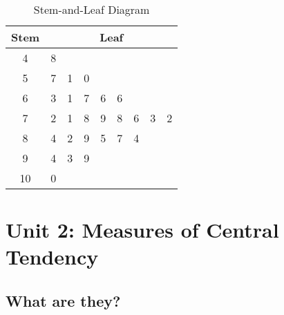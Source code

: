\documentclass[
10pt, %
a4paper, %
]{report}
\begin{document}
\begin{table}[H]
\begin{center}
\begin{tabular}{|c|cccccccc|}
\hline
Stem &
  \multicolumn{8}{c|}{Leaf} \\ \hline
4 &
  \multicolumn{1}{c|}{8} &
  \multicolumn{1}{c|}{} &
  \multicolumn{1}{c|}{} &
  \multicolumn{1}{c|}{} &
  \multicolumn{1}{c|}{} &
  \multicolumn{1}{c|}{} &
  \multicolumn{1}{c|}{} &
   \\ \hline
5 &
  \multicolumn{1}{c|}{7} &
  \multicolumn{1}{c|}{1} &
  \multicolumn{1}{c|}{0} &
  \multicolumn{1}{c|}{} &
  \multicolumn{1}{c|}{} &
  \multicolumn{1}{c|}{} &
  \multicolumn{1}{c|}{} &
   \\ \hline
6 &
  \multicolumn{1}{c|}{3} &
  \multicolumn{1}{c|}{1} &
  \multicolumn{1}{c|}{7} &
  \multicolumn{1}{c|}{6} &
  \multicolumn{1}{c|}{6} &
  \multicolumn{1}{c|}{} &
  \multicolumn{1}{c|}{} &
   \\ \hline
7 &
  \multicolumn{1}{c|}{2} &
  \multicolumn{1}{c|}{1} &
  \multicolumn{1}{c|}{8} &
  \multicolumn{1}{c|}{9} &
  \multicolumn{1}{c|}{8} &
  \multicolumn{1}{c|}{6} &
  \multicolumn{1}{c|}{3} &
  2 \\ \hline
8 &
  \multicolumn{1}{c|}{4} &
  \multicolumn{1}{c|}{2} &
  \multicolumn{1}{c|}{9} &
  \multicolumn{1}{c|}{5} &
  \multicolumn{1}{c|}{7} &
  \multicolumn{1}{c|}{4} &
  \multicolumn{1}{c|}{} &
   \\ \hline
9 &
  \multicolumn{1}{c|}{4} &
  \multicolumn{1}{c|}{3} &
  \multicolumn{1}{c|}{9} &
  \multicolumn{1}{c|}{} &
  \multicolumn{1}{c|}{} &
  \multicolumn{1}{c|}{} &
  \multicolumn{1}{c|}{} &
   \\ \hline
10 &
  \multicolumn{1}{c|}{0} &
  \multicolumn{1}{c|}{} &
  \multicolumn{1}{c|}{} &
  \multicolumn{1}{c|}{} &
  \multicolumn{1}{c|}{} &
  \multicolumn{1}{c|}{} &
  \multicolumn{1}{c|}{} &
   \\ \hline
\end{tabular}
\end{center}
\caption{Stem-and-Leaf Diagram}
\label{fig:stemleaf}
\end{table}






\chapter*{Unit 2: Measures of Central Tendency}
\section*{What are they?}
\end{document}
